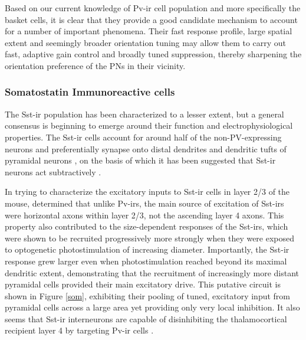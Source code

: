 Based on our current knowledge of Pv-ir cell population and more
specifically the basket cells, it is clear that they provide a good
candidate mechanism to account for a number of important phenomena. Their fast
response profile, large spatial extent and seemingly broader
orientation tuning may allow them to carry out fast, adaptive gain
control and broadly tuned suppression, thereby sharpening the
orientation preference of the PNs in their vicinity.

\subsubsection{Somatostatin Immunoreactive cells}

The Sst-ir population has been characterized to a lesser extent, but a
general consensus is beginning to emerge around their function and
electrophysiological properties. The Sst-ir cells account for around
half of the non-PV-expressing neurons \citep{Gonchar2007,Xu2010} and
preferentially synapse onto distal dendrites and dendritic tufts of
pyramidal neurons \citep{DiCristo2004,Silberberg2007}, on the basis of
which it has been suggested that Sst-ir neurons act subtractively
\citep{Wilson2012}.

In trying to characterize the excitatory inputs to Sst-ir cells in
layer 2/3 of the mouse, \cite{Xu2009} determined that unlike Pv-irs,
the main source of excitation of Sst-irs were horizontal axons within
layer 2/3, not the ascending layer 4 axons. This property also
contributed to the size-dependent responses of the Sst-irs, which were
shown to be recruited progressively more strongly when they were
exposed to optogenetic photostimulation of increasing
diameter. Importantly, the Sst-ir response grew larger even when
photostimulation reached beyond its maximal dendritic extent,
demonstrating that the recruitment of increasingly more distant
pyramidal cells provided their main excitatory drive. This putative
circuit is shown in Figure \ref{som}, exhibiting their pooling of
tuned, excitatory input from pyramidal cells across a large area
yet providing only very local inhibition. It also seems that
Sst-ir interneurons are capable of disinhibiting the thalamocortical
recipient layer 4 by targeting Pv-ir cells \citep{Xu2013}.

